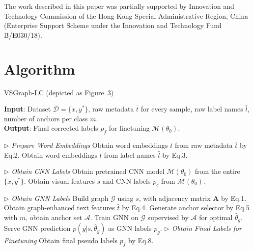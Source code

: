 \documentclass[sigconf]{acmart}
\begin{document}
\begin{acks}
The work described in this paper was partially supported by Innovation and Technology Commission of the Hong Kong Special Administrative Region, China (Enterprise Support Scheme under the Innovation and Technology Fund B/E030/18).
\end{acks}
\newpage













	















\newpage
\appendix


\section{Algorithm}
\begin{algorithm}[]
	\caption{VSGraph-LC (depicted as Figure~3)}
	\label{alg:algorithm}
	\begin{flushleft}
		\textbf{Input}: Dataset $\mathcal{D}=\{x,y^*\}$, raw metadata $\bar{t}$ for every sample, raw label names $\bar{l}$, number of anchors per class $m$.\\
		\textbf{Output}: Final corrected labels $p_f$ for finetuning $\mathcal{M}(\theta_0)$.
	\end{flushleft}
	\begin{algorithmic}[1] \STATEx \hspace{-0.6cm} \textit{$\triangleright$ Prepare Word Embeddings}
		\STATE Obtain word embeddings $t$ from raw metadata $\bar{t}$ by Eq.2.
		\STATE Obtain word embeddings $l$ from label names $\bar{l}$ by Eq.3.
		
		\STATEx \hspace{-0.6cm} \textit{$\triangleright$ Obtain CNN Labels}
		\STATE Obtain pretrained CNN model $\mathcal{M}(\theta_0)$ from the entire $\{x,y^*\}$.
		\STATE Obtain visual features $s$ and CNN labels $p_c$ from $\mathcal{M}(\theta_0)$.
		
		\STATEx \hspace{-0.6cm} \textit{$\triangleright$ Obtain GNN Labels}
		\STATE Build graph $\mathcal{G}$ using $s$, with adjacency matrix $\mathbf{A}$ by Eq.1.
		\STATE Obtain graph-enhanced text features $\hat{t}$ by Eq.4.
		\STATE Generate anchor selector by Eq.5 with $m$, obtain anchor set $\mathcal{A}$.
		\STATE Train GNN on $\mathcal{G}$ supervised by $\mathcal{A}$ for optimal $\hat{\theta}_g$.
		\STATE Serve GNN prediction $p(y|s,\hat{\theta}_g)$ as GNN labels $p_g$.
		\STATEx \hspace{-0.6cm} \textit{$\triangleright$ Obtain Final Labels for Finetuning}
		\STATE Obtain final pseudo labels $p_f$ by Eq.8.
	\end{algorithmic}
\end{algorithm}
\end{document}
